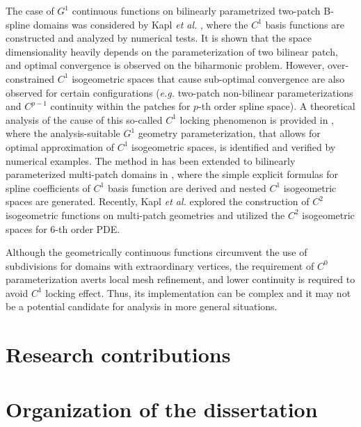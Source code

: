 The case of $G^1$ continuous functions on bilinearly parametrized two-patch B-spline domains was considered by Kapl \textit{et al.} \cite{kapl_isogeometric_2015}, where the $C^1$ basis functions are constructed and analyzed by numerical tests. It is shown that the space dimensionality heavily depends on the parameterization of two bilinear patch, and optimal convergence is observed on the biharmonic problem. However, over-constrained $C^1$ isogeometric spaces that cause sub-optimal convergence are also observed for certain configurations (\textit{e.g.} two-patch non-bilinear parameterizations and $C^{p-1}$ continuity within the patches for $p$-th order spline space). A theoretical analysis of the cause of this so-called $C^1$ locking phenomenon is provided in \cite{collin_analysis-suitable_2016}, where the analysis-suitable $G^1$ geometry parameterization, that allows for optimal approximation of $C^1$ isogeometric spaces, is identified and verified by numerical examples. The method in \cite{kapl_isogeometric_2015} has been extended to bilinearly parameterized multi-patch domains in \cite{kapl_isogeometric_2017}, where the simple explicit formulas for spline coefficients of $C^1$ basis function are derived and nested $C^1$ isogeometric spaces are generated. Recently, Kapl \textit{et al.} \cite{kapl_space_2017,kapl_space_nodate} explored the construction of $C^2$ isogeometric functions on multi-patch geometries and utilized the $C^2$ isogeometric spaces for $6$-th order PDE.\par
Although the geometrically continuous functions circumvent the use of subdivisions for domains with extraordinary vertices, the requirement of $C^0$ parameterization averts local mesh refinement, and lower continuity is required to avoid $C^1$ locking effect. Thus, its implementation can be complex and it may not be a potential candidate for analysis in more general situations.\par


\section{Research contributions}

\section{Organization of the dissertation}